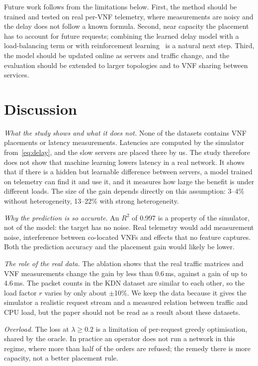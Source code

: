\documentclass[conference,a4paper]{IEEEtran}
\begin{document}
Future work follows from the limitations below. First, the method should be trained and tested on real per-VNF
telemetry, where measurements are noisy and the delay does not follow a known formula. Second, near capacity the
placement has to account for future requests; combining the learned delay model with a load-balancing term or with
reinforcement learning~\cite{pei2020drl} is a natural next step. Third, the model should be updated online as servers
and traffic change, and the evaluation should be extended to larger topologies and to VNF sharing between services.

\section{Discussion}
\label{sec:discussion}
\emph{What the study shows and what it does not.} None of the datasets contains VNF placements or latency
measurements. Latencies are computed by the simulator from~\eqref{eq:delay}, and the slow servers are placed there
by us. The study therefore does not show that machine learning lowers latency in a real network. It shows that if
there is a hidden but learnable difference between servers, a model trained on telemetry can find it and use it, and
it measures how large the benefit is under different loads. The size of the gain depends directly on this assumption:
3--4\% without heterogeneity, 13--22\% with strong heterogeneity.

\emph{Why the prediction is so accurate.} An $R^2$ of 0.997 is a property of the simulator, not of the model:
the target has no noise. Real telemetry would add measurement noise, interference between co-located VNFs and
effects that no feature captures. Both the prediction accuracy and the placement gain would likely be lower.

\emph{The role of the real data.} The ablation shows that the real traffic matrices and VNF measurements change the
gain by less than 0.6\,ms, against a gain of up to 4.6\,ms. The packet counts in the KDN dataset are similar to each other, so the load factor $r$
varies by only about $\pm$10\%. We keep the data because it gives the simulator a realistic request stream and a
measured relation between traffic and CPU load, but the paper should not be read as a result about these datasets.

\emph{Overload.} The loss at $\lambda \ge 0.2$ is a limitation of per-request greedy optimisation, shared by the
oracle. In practice an operator does not run a network in this regime, where more than half of the orders are
refused; the remedy there is more capacity, not a better placement rule.
\end{document}
